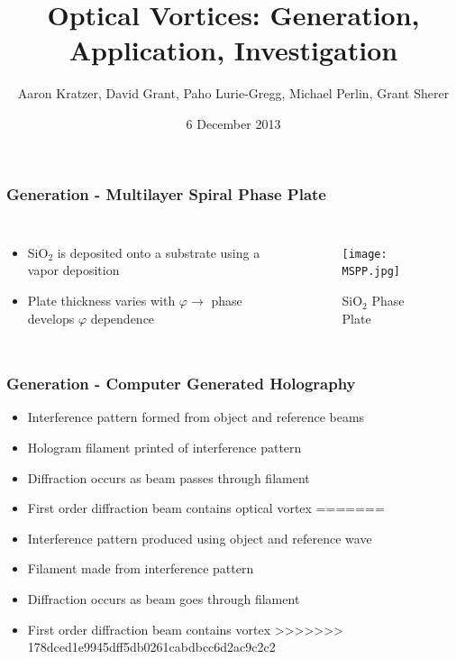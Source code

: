 \documentclass[xcolor=dvipsnames]{beamer}
\title{Optical Vortices: Generation, Application, Investigation}
\author{Aaron Kratzer, David Grant, Paho Lurie-Gregg,
  Michael Perlin, Grant Sherer}
\date{6 December 2013}
\newenvironment{items}[1][]
{\begin{itemize}
    \ifthenelse{\isempty{#1}}
    {\setlength{\itemsep}{12pt}}{\setlength{\itemsep}{#1}}}
  {\end{itemize}}
\renewcommand{\phi}{\varphi} %
\begin{document}
\begin{frame}
  \maketitle
\end{frame}

\begin{frame}
        \frametitle{Generation - Multilayer Spiral Phase Plate}
  \begin{columns}[c]
    \begin{items}
    \item SiO$_2$ is deposited onto a substrate using a vapor deposition
    \item Plate thickness varies with $\phi\to$ phase
      develops $\phi$ dependence

    \end{items}
    \begin{figure}
      \texttt{[image: MSPP.jpg]}
      \caption{SiO$_2$ Phase Plate}
      \label{MSPP}
    \end{figure}
  \end{columns}
\end{frame}

\begin{frame}
        \frametitle{Generation - Computer Generated Holography}
  \begin{items}
<<<<<<< HEAD
  \item Interference pattern formed from object and reference beams
  \item Hologram filament printed of interference pattern
  \item Diffraction occurs as beam passes through filament
  \item First order diffraction beam contains optical vortex
=======
  \item Interference pattern produced using object and reference wave
  \item Filament made from interference pattern
  \item Diffraction occurs as beam goes through filament
  \item First order diffraction beam contains vortex
>>>>>>> 178dced1e9945dff5db0261cabdbcc6d2ac9c2c2
  \end{items}
\end{frame}
\end{document}
